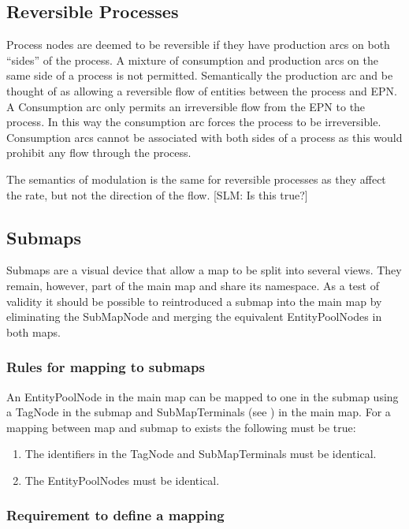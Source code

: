 \subsection{Reversible Processes}
\label{sec: semantics reversible procs}

Process nodes are deemed to be reversible if they have production arcs on both ``sides'' of the process. A mixture of consumption and production arcs on the same side of a process is not permitted. Semantically the production arc and be thought of as allowing a reversible flow of entities between the process and EPN. A Consumption arc only permits an irreversible flow from the EPN to the process. In this way the consumption arc forces the process to be irreversible. Consumption arcs cannot be associated with both sides of a process as this would prohibit any flow through the process.

The semantics of modulation is the same for reversible processes as they affect the rate, but not the direction of the flow. [SLM: Is this true?]

\subsection{Submaps}

Submaps are a visual device that allow a map to be split into several
views. They remain, however, part of the main map and share its
namespace. As a test of validity it should be possible to reintroduced
a submap into the main map by eliminating the SubMapNode and merging
the equivalent EntityPoolNodes in both maps.

\subsubsection{Rules for mapping to submaps}

An EntityPoolNode in the main map can be mapped to one in the submap
using a TagNode in the submap and SubMapTerminals (see ) in the main map. For a
mapping between map and submap to exists the following must be true:

\begin{enumerate}
\item The identifiers in the TagNode and SubMapTerminals must be identical.
\item The EntityPoolNodes must be identical.
\end{enumerate}

\subsubsection{Requirement to define a mapping}

